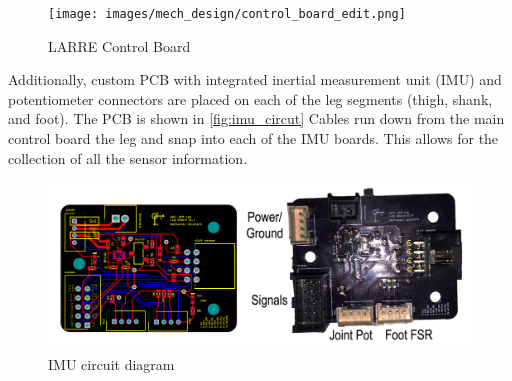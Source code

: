 \begin{figure}
    \centering
    \texttt{[image: images/mech\_design/control\_board\_edit.png]}
    \caption[LARRE Control Board]{LARRE Control Board}
    \label{fig:controlboard}
\end{figure}

Additionally, custom PCB with integrated inertial measurement unit (IMU) and potentiometer connectors are placed on each of the leg segments (thigh, shank, and foot). The PCB is shown in \autoref{fig:imu_circut} Cables run down from the main control board the leg and snap into each of the IMU boards. This allows for the collection of all the sensor information.  

\begin{figure}
    \centering
    \includegraphics[scale=0.23]{images/mech_design/IMU_diagram.png}
    \caption{IMU circuit diagram}
    \label{fig:imu_circut}
\end{figure}

